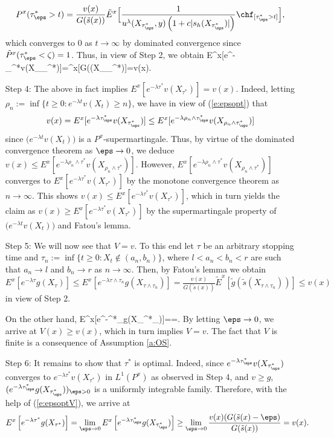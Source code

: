 \documentclass[11pt,reqno]{amsart}
\numberwithin{equation}{section}
\def\rar{\rightarrow}
\begin{document}
\begin{itemize}
		\[
		P^x(\tau_{\eps}^*>t)=\frac{v(x)}{G(\tilde{s}(x))}\tilde{E}^x\Big[\frac{1}{{u^{\lambda}(X_{\tau_{\eps}^*},y)\left(1+c|s_h(X_{\tau_{\eps}^*})|\right)}}\chf_{[\tau_{\eps}^*>t]}\Big],
		\] 
		which converges to $0$ as $t \rar \infty$ by dominated convergence since $\tilde{P}^x(\tau_{\eps}^*<\zeta)=1$.  Thus, in view of Step 2, we obtain
		\be \label{e:epsopt}
		E^x[e^{-\lambda \tau_{\eps}^*}v(X_{\tau_{\eps}^*})]=^x[G((X_{\tau_{\eps}^*})]=v(x).
		\ee
		\item[Step 4:] The above in fact implies $E^x[e^{-\lambda \tau^*}v(X_{\tau^*})]=v(x)$. Indeed, letting $\rho_n:=\inf\{t\geq0: e^{-\lambda t}v(X_t)\geq n\}$, we have in view of (\ref{e:epsopt}) that
		\[
		v(x)=E^x[e^{-\lambda \tau_{\eps}^*}v(X_{\tau_{\eps}^*})]\leq E^x[e^{-\lambda \rho_n\wedge\tau_{\eps}^*}v(X_{\rho_n \wedge \tau_{\eps}^*})]
		\]
		since $\big(e^{-\lambda t}v(X_t)\big)$  is  a $P^x$-supermartingale.
		Thus, by  virtue of the dominated convergence theorem as $\eps\rar 0$, we deduce $v(x)\leq E^x[e^{-\lambda \rho_n\wedge\tau^*}v(X_{\rho_n \wedge \tau^*})]$. However, $E^x[e^{-\lambda \rho_n\wedge\tau^*}v(X_{\rho_n \wedge \tau^*})]$ converges to $E^x[e^{-\lambda \tau^*}v(X_{ \tau^*})]$ by the monotone convergence theorem as $n \rar \infty$. This shows $v(x)\leq E^x[e^{-\lambda \tau^*}v(X_{ \tau^*})]$, which in turn yields the claim as $v(x)\geq E^x[e^{-\lambda \tau^*}v(X_{ \tau^*})]$ by the supermartingale property of $\big(e^{-\lambda t}v(X_t)\big)$ and  Fatou's lemma.
		\item[Step 5:] We will now see that $V=v$. To this end let $\tau$ be an arbitrary stopping time and $\tau_n:=\inf\{t\geq 0: X_t \notin (a_n,b_n)\}$, where $l<a_n<b_n<r$ are such that $a_n \rar l$ and $b_n \rar r$ as $n \rar \infty$. Then, by Fatou's lemma  we obtain $E^x[e^{-\lambda \tau}g(X_{\tau})]\leq E^x[e^{-\lambda \tau\wedge \tau_n}g(X_{\tau\wedge \tau_n})]=\frac{v(x)}{G(\tilde{s}(x))}\tilde{E}^x\left[\tilde{g}(\tilde{s}(X_{\tau\wedge \tau_n}))\right]\leq v(x)$  in view of Step 2.
		
		On the other hand, 
		\be \label{e:epsoptV}
		E^x[e^{-\lambda\tau^*_{\eps}}g(X_{\tau^*_{\eps}})]=\geq {}=.
		\ee
		By letting $\eps \rar 0$, we arrive at $V(x)\geq v(x)$, which in turn implies $V=v$. The fact that $V$ is finite is a consequence of Assumption \ref{a:OS}.
		\item[Step 6:] It remains to show that $\tau^*$ is optimal. Indeed, since $e^{-\lambda \tau_{\eps}^*}v(X_{\tau_{\eps}^*})$ converges to $e^{-\lambda \tau^*}v(X_{\tau^*})$ in $L^1(P^x)$ as observed in Step 4, and $v\geq g$, $(e^{-\lambda \tau_{\eps}^*}g(X_{\tau_{\eps}^*}))_{\eps >0}$ is a uniformly integrable family. Therefore, with the help of  (\ref{e:epsoptV}), we arrive at
		\[
		E^x\left[e^{-\lambda \tau^*}g(X_{\tau^*})\right]=\lim_{\eps \rar 0}E^x\left[e^{-\lambda \tau_{\eps}^*}g(X_{\tau_{\eps}^*})\right]\geq \lim_{\eps \rar 0} \frac{v(x)(G(\tilde{s}(x)-\eps)}{G(\tilde{s}(x))}=v(x).
		\]
	\end{itemize}
\end{document}

